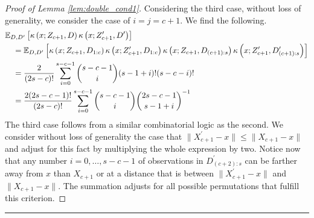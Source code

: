 \begin{proof}[Proof of Lemma \ref{lem:double_cond1}]
    Considering the third case, without loss of generality, we consider the case of $i = j = c+1$.
    We find the following.
    \begin{equation}
        \begin{aligned}
            & \mathbb{E}_{D, D^{\prime}}\left[\kappa\left(x; Z_{c+1}, D\right)\kappa\left(x; Z_{c+1}^{\prime}, D^{\prime}\right)\right]\\
            & \quad  = \mathbb{E}_{D, D^{\prime}}\left[
                \kappa\left(x; Z_{c+1}, D_{1:c}\right)\kappa\left(x; Z_{c+1}^{\prime}, D_{1:c}\right)
                \kappa\left(x; Z_{c+1}, D_{(c+1):s}\right)\kappa\left(x; Z_{c+1}^{\prime}, D_{(c+1):s}^{\prime}\right)
            \right]\\
            & \quad = \frac{2}{(2s - c)!} \sum_{i = 0}^{s-c-1} \binom{s - c - 1}{i}(s - 1 + i)!(s-c-i)! \\
            & \quad = \frac{2(2s - c - 1)!}{(2s-c)!} \sum_{i = 0}^{s-c-1} \binom{s - c - 1}{i}\binom{2s - c - 1}{s-1+i}^{-1}
        \end{aligned}
    \end{equation}
    The third case follows from a similar combinatorial logic as the second.
    We consider without loss of generality the case that $\|X_{c+1}^{\prime} - x\| \leq \|X_{c+1}-x\|$ and adjust for this fact by multiplying the whole expression by two.
    Notice now that any number $i = 0, \dotsc, s-c-1$ of observations in $D^{\prime}_{(c+2):s}$ can be farther away from $x$ than $X_{c+1}$ or at a distance that is between $\|X_{c+1}^{\prime} - x\|$ and $\|X_{c+1}-x\|$.
    The summation adjusts for all possible permutations that fulfill this criterion.
\end{proof}

\hrule

